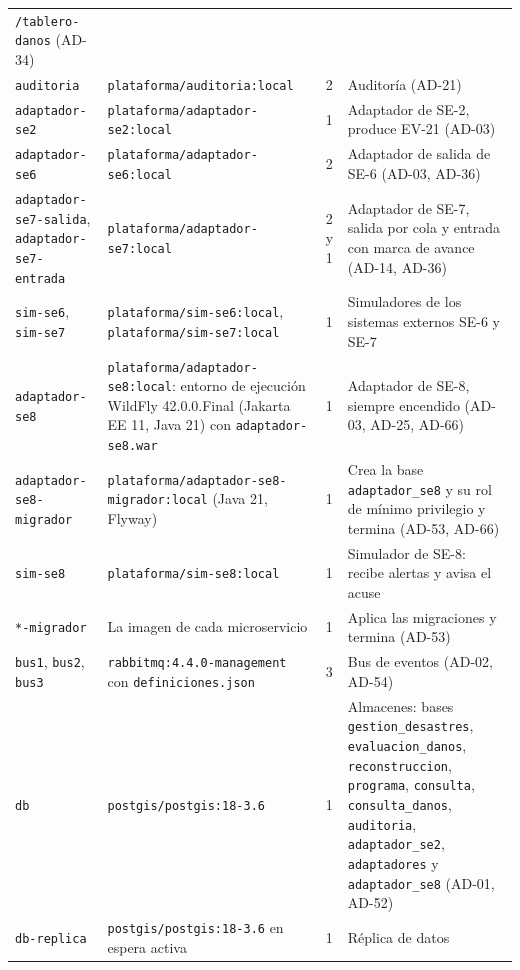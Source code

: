 \documentclass[11pt,letterpaper]{article}
\providecommand{\br}{\discretionary{}{}{}}
\begin{document}
\begin{longtable}{L{3.4cm} L{4.4cm} L{1.5cm} L{6.2cm}}
\texttt{/\br{}tablero-\br{}danos} (AD-34) \\
\texttt{auditoria} & \texttt{plataforma/\br{}auditoria:\br{}local} & 2 & Auditoría (AD-21) \\
\texttt{adaptador-se2} & \texttt{plataforma/\br{}adaptador-\br{}se2:\br{}local} & 1 & Adaptador de SE-2, produce
EV-21 (AD-03) \\
\texttt{adaptador-se6} & \texttt{plataforma/\br{}adaptador-\br{}se6:\br{}local} & 2 & Adaptador de salida de SE-6
(AD-03, AD-36) \\
\texttt{adaptador-\br{}se7-\br{}salida}, \texttt{adaptador-\br{}se7-\br{}entrada} & \texttt{plataforma/\br{}adaptador-\br{}se7:\br{}local}
& 2 y 1 & Adaptador de SE-7, salida por cola y entrada con marca de avance (AD-14, AD-36) \\
\texttt{sim-se6}, \texttt{sim-se7} & \texttt{plataforma/\br{}sim-\br{}se6:\br{}local},
\texttt{plataforma/\br{}sim-\br{}se7:\br{}local} & 1 & Simuladores de los sistemas externos SE-6 y SE-7 \\
\texttt{adaptador-se8} & \texttt{plataforma/\br{}adaptador-\br{}se8:\br{}local}: entorno de ejecución WildFly
42.0.0.Final (Jakarta EE 11, Java 21) con \texttt{adaptador-se8.war} & 1 & Adaptador de SE-8, siempre
encendido (AD-03, AD-25, AD-66) \\
\texttt{adaptador-\br{}se8-\br{}migrador} & \texttt{plataforma/\br{}adaptador-\br{}se8-\br{}migrador:\br{}local}
(Java 21, Flyway) & 1 & Crea la base \texttt{adaptador\_\br{}se8} y su rol de mínimo privilegio y termina
(AD-53, AD-66) \\
\texttt{sim-se8} & \texttt{plataforma/\br{}sim-\br{}se8:\br{}local} & 1 & Simulador de SE-8: recibe alertas y
avisa el acuse \\
\texttt{*-migrador} & La imagen de cada microservicio & 1 & Aplica las migraciones y termina
(AD-53) \\
\texttt{bus1}, \texttt{bus2}, \texttt{bus3} & \texttt{rabbitmq:\br{}4.\br{}4.\br{}0-\br{}management} con
\texttt{definiciones.\br{}json} & 3 & Bus de eventos (AD-02, AD-54) \\
\texttt{db} & \texttt{postgis/\br{}postgis:\br{}18-\br{}3.\br{}6} & 1 & Almacenes: bases \texttt{gestion\_\br{}desastres},
\texttt{evaluacion\_\br{}danos}, \texttt{reconstruccion}, \texttt{programa}, \texttt{consulta},
\texttt{consulta\_\br{}danos}, \texttt{auditoria}, \texttt{adaptador\_\br{}se2}, \texttt{adaptadores} y
\texttt{adaptador\_\br{}se8} (AD-01, AD-52) \\
\texttt{db-replica} & \texttt{postgis/\br{}postgis:\br{}18-\br{}3.\br{}6} en espera activa & 1 & Réplica de datos

\end{longtable}
\end{document}

